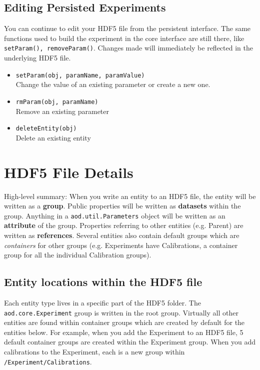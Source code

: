 \documentclass[10pt]{exam}
\newcommand\aodclass[1]{\textcolor{codeblue}{\texttt{#1}}}
\newcommand\aodfcn[1]{\textcolor{darkteal}{\texttt{#1}}}
\begin{document}
	\subsection{Editing Persisted Experiments}
	\noindent You can continue to edit your HDF5 file from the persistent interface. The same functions used to build the experiment in the core interface are still there, like \aodfcn{setParam(), removeParam()}. Changes made will immediately be reflected in the underlying HDF5 file. 
	
	\begin{itemize}
		\item \aodfcn{setParam(obj, paramName, paramValue)}\\
		Change the value of an existing parameter or create a new one. 
		\item \aodfcn{rmParam(obj, paramName)}\\
		Remove an existing parameter
		\item \aodfcn{deleteEntity(obj)}\\
		Delete an existing entity
	\end{itemize}

\section{HDF5 File Details}
	\label{section:HDF5_Details}
	\noindent High-level summary: When you write an entity to an HDF5 file, the entity will be written as a \textbf{group}. Public properties will be written as  \textbf{datasets} within the group. Anything in a \aodclass{aod.util.Parameters} object will be written as an \textbf{attribute} of the group. Properties referring to other entities (e.g. Parent) are written as \textbf{references}.  Several entities also contain default groups which are \textit{containers} for other groups (e.g. Experiments have Calibrations, a container group for all the individual Calibration groups). 
	
	\subsection{Entity locations within the HDF5 file}
		\label{subsection:EntityLocationsInHDF5}
		\noindent Each entity type lives in a specific part of the HDF5 folder. The \aodclass{aod.core.Experiment} group is written in the root group. Virtually all other entities are found within container groups which are created by default for the entities below. For example, when you add the Experiment to an HDF5 file, 5 default container groups are created within the Experiment group. When you add calibrations to the Experiment, each is a new group within \texttt{/Experiment/Calibrations}. \\
		
\end{document}
